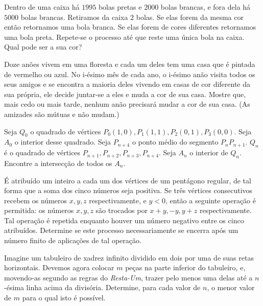 \begin{questao}
  Dentro de uma caixa há $1995$ bolas pretas e $2000$ bolas brancas, e fora dela
  há $5000$ bolas brancas. Retiramos da caixa $2$ bolas. Se elas forem da mesma
  cor então retornamos uma bola branca. Se elas forem de cores diferentes
  retornamos uma bola preta. Repete-se o processo até que reste uma única bola
  na caixa. Qual pode ser a sua cor?
\end{questao}

\begin{questao}
  Doze anões vivem em uma floresta e cada um deles tem uma casa que é pintada de
  vermelho ou azul. No i-ésimo mês de cada ano, o i-ésimo anão visita todos os
  seus amigos e se encontra a maioria deles vivendo em casas de cor diferente da
  sua própria, ele decide juntar-se a eles e muda a cor de sua casa. Mostre que,
  mais cedo ou mais tarde, nenhum anão precisará mudar a cor de sua casa. (As
  amizades são mútuas e não mudam.)
\end{questao}

\begin{questao}
  Seja $Q_0$ o quadrado de vértices $P_0(1,0),P_1(1,1),P_2(0,1),P_3(0,0)$. Seja
  $A_0$ o interior desse quadrado. Seja $P_{n+4}$ o ponto médio do segmento
  $P_nP_{n+1}$. $Q_n$ é o quadrado de vértices
  $P_{n+1},P_{n+2},P_{n+3},P_{n+4}$. Seja $A_n$ o interior de $Q_n$. Encontre a
  intersecção de todos os $A_n$.
\end{questao}

\begin{questao}
  É atribuído um inteiro a cada um dos vértices de um pentágono regular, de tal
  forma que a soma dos cinco números seja positiva. Se três vértices
  consecutivos recebem os números $x,y,z$ respectivamente, e $y<0$, então a
  seguinte operação é permitida: os números $x,y,z$ são trocados por
  $x+y,-y,y+z$ respectivamente. Tal operação é repetida enquanto houver um
  número negativo entre os cinco atribuídos. Determine se este processo
  necessariamente se encerra após um número finito de aplicações de tal
  operação.
\end{questao}

\begin{questao}
  Imagine um tabuleiro de xadrez infinito dividido em dois por uma de suas retas
  horizontais. Devemos agora colocar $m$ peças na parte inferior do tabuleiro,
  e, movendo-as segundo as regras do {\it Resta-Um}, trazer pelo menos uma delas
  até a $n$-ésima linha acima da divisória. Determine, para cada valor de $n$, o
  menor valor de $m$ para o qual isto é possível.

\end{questao}


